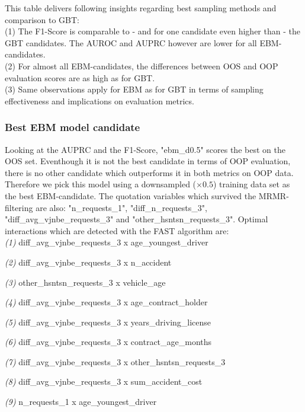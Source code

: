 \documentclass[12pt,titlepage]{article}
\begin{document}
\noindent
This table delivers following insights regarding best sampling methods and comparison to GBT: \\
(1) The F1-Score is comparable to - and for one candidate even higher than - the GBT candidates. The AUROC and AUPRC however are lower for all EBM-candidates. \\
(2) For almost all EBM-candidates, the differences between OOS and OOP evaluation scores are as high as for GBT. \\
(3) Same observations apply for EBM as for GBT in terms of sampling effectiveness and implications on evaluation metrics. \\

\subsubsection*{Best EBM model candidate}

Looking at the AUPRC and the F1-Score, "ebm\_d0.5" scores the best on the OOS set. Eventhough it is not the best candidate in terms of OOP evaluation, there is no other candidate which outperforms it in both metrics on OOP data. Therefore we pick this model using a downsampled ($\times 0.5$) training data set as the best EBM-candidate. The quotation variables which survived the MRMR-filtering are also: "n\_requests\_1", "diff\_n\_requests\_3", "diff\_avg\_vjnbe\_requests\_3" and "other\_hsntsn\_requests\_3". Optimal interactions which are detected with the FAST algorithm are: \\

\vspace{3mm}
\textit{(1)} diff\_avg\_vjnbe\_requests\_3 x age\_youngest\_driver \par
\textit{(2)} diff\_avg\_vjnbe\_requests\_3 x n\_accident \par
\textit{(3)} other\_hsntsn\_requests\_3 x vehicle\_age \par
\textit{(4)} diff\_avg\_vjnbe\_requests\_3 x age\_contract\_holder \par
\textit{(5)} diff\_avg\_vjnbe\_requests\_3 x years\_driving\_license \par
\textit{(6)} diff\_avg\_vjnbe\_requests\_3 x contract\_age\_months \par
\textit{(7)} diff\_avg\_vjnbe\_requests\_3 x other\_hsntsn\_requests\_3 \par
\textit{(8)} diff\_avg\_vjnbe\_requests\_3 x sum\_accident\_cost \par
\textit{(9)} n\_requests\_1 x age\_youngest\_driver \\
\vspace{1mm}
\end{document}
